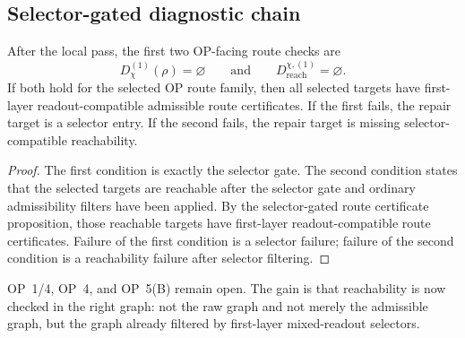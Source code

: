 \subsection{Selector-gated diagnostic chain}
\label{subsec:v410r23-selector-gated-diagnostic-chain}

\begin{theorem}
\label{thm:v410r23-selector-gated-reachability-reduction}
After the local pass, the first two OP-facing route checks are
\[
 D_{\chi}^{(1)}(\rho)=\varnothing
 \qquad\text{and}\qquad
 D_{\mathrm{reach}}^{\chi,(1)}=\varnothing.
\]
If both hold for the selected OP route family, then all selected targets have
first-layer readout-compatible admissible route certificates. If the first
fails, the repair target is a selector entry. If the second fails, the repair
target is missing selector-compatible reachability.
\end{theorem}

\begin{proof}
The first condition is exactly the selector gate. The second condition
states that the selected targets are reachable after the selector gate and
ordinary admissibility filters have been applied. By the selector-gated route
certificate proposition, those reachable targets have first-layer
readout-compatible route certificates. Failure of the first condition is a
selector failure; failure of the second condition is a reachability failure
after selector filtering.
\end{proof}

\begin{remark}
\label{rem:v410r23-op-status}
OP~1/4, OP~4, and OP~5(B) remain open. The gain is that reachability is now
checked in the right graph: not the raw graph and not merely the admissible
graph, but the graph already filtered by first-layer mixed-readout selectors.
\end{remark}



